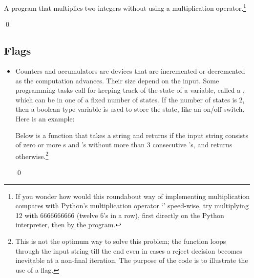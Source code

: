 \documentclass[a4paper]{article}
\begin{document}
{\begin{itemize}
\begin{uexample}[Multiplication]
A program that multiplies two integers without using a multiplication
operator.\footnote{If you wonder how would this roundabout way of implementing multiplication
compares with Python's multiplication operator `\pyv{*}' speed-wise, try
multiplying 12 with 6666666666 (twelve 6's in a row), first directly on the
Python interpreter, then by the program.}

\begin{ucodeframe}
\end{ucodeframe}
\qed
\end{uexample}

\end{itemize}


\subsection{Flags} 

\begin{itemize}

\item Counters and accumulators are devices that are incremented or decremented
as the computation advances. Their size depend on the input. Some programming
tasks call for keeping track of the state of a variable, called
 a ,  which can be in one of
a fixed number of states. If
the number of states is 2, then a boolean type variable is used to store the
state, like an on/off switch. Here is an example:

\begin{uexample}

Below is a function that takes a string and returns
 if the input string consists of zero or more s and 's
without more than 3 consecutive
's, and returns  otherwise.\footnote{This is not the optimum way
to solve this problem; the function loops through the input string till the end
even in cases a reject decision becomes inevitable at a non-final iteration. The
purpose of the code is to illustrate the use of a flag.}

\begin{ucodeframe}
\end{ucodeframe}

\qed
\end{uexample}

\end{itemize}

}
\end{document}

